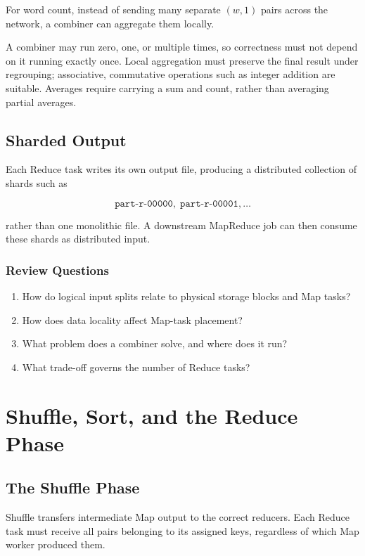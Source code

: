 \documentclass[11pt,a4paper,oneside]{book}
\begin{document}
For word count, instead of sending many separate \((w,1)\) pairs across the network, a combiner can aggregate them locally.

A combiner may run zero, one, or multiple times, so correctness must not depend on it running exactly once. Local aggregation must preserve the final result under regrouping; associative, commutative operations such as integer addition are suitable. Averages require carrying a sum and count, rather than averaging partial averages.

\subsection{Sharded Output}

Each Reduce task writes its own output file, producing a distributed collection of shards such as

\[
\texttt{part-r-00000},\;
\texttt{part-r-00001},\ldots
\]

rather than one monolithic file. A downstream MapReduce job can then consume these shards as distributed input.

\subsubsection*{Review Questions}
\begin{enumerate}
    \item How do logical input splits relate to physical storage blocks and Map tasks?
    \item How does data locality affect Map-task placement?
    \item What problem does a combiner solve, and where does it run?
    \item What trade-off governs the number of Reduce tasks?
\end{enumerate}


\section{Shuffle, Sort, and the Reduce Phase}

\subsection{The Shuffle Phase}

Shuffle transfers intermediate Map output to the correct reducers. Each Reduce task must receive all pairs belonging to its assigned keys, regardless of which Map worker produced them.
\end{document}

